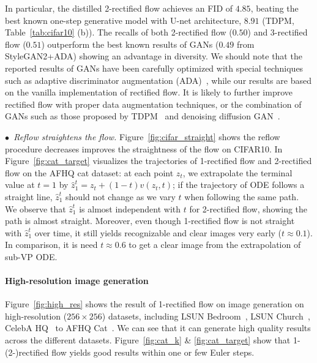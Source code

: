 In particular, 
the distilled 2-rectified flow achieves an FID of $4.85$, beating the best known one-step generative model with U-net architecture, $8.91$ (TDPM, Table~\ref{tab:cifar10} (b)).
The recalls of 
both 2-rectified flow ($0.50$) and 3-rectified flow ($0.51$) outperform the best known results of GANs ($0.49$ from StyleGAN2+ADA)
showing an advantage in diversity. 
We should note that the reported results of GANs have been carefully optimized 
with special techniques such as adaptive discriminator augmentation (ADA)~\citep{karras2020training}, while our results are
based on the vanilla implementation of rectified flow. 
It is likely to further improve rectified flow with proper data augmentation techniques, or the combination of GANs such as 
those proposed by TDPM~\citep{zheng2022truncated} and denoising diffusion GAN~\citep{xiao2021tackling}.







\emph{$\bullet$~Reflow straightens the flow.} 
Figure~\ref{fig:cifar_straight} shows the reflow procedure decreases improves the straightness of the flow on CIFAR10.  
In Figure~\ref{fig:cat_target} visualizes the trajectories of 1-rectified flow and 2-rectified flow on the AFHQ cat dataset: 
at each point $z_t$, we extrapolate the terminal value at $t=1$ by 
$\hat{z}_1^t = z_t + (1-t) v(z_t, t)$; 
if the trajectory of ODE follows a straight line, 
$\hat{z}_1^t$ should not change  as we vary $t$ when following the same path.  
We observe that $\hat{z}_1^t$ is almost independent with $t$ for 2-rectified flow, 
showing the path is almost straight.  
Moreover, even though 1-rectified flow is not straight with $\hat z_1^t$ over time, 
it still yields recognizable and clear images very early ($t\approx 0.1$). 
In comparison,  
it is need $t\approx 0.6$ to get a clear image
from the extrapolation of sub-VP ODE.  



\paragraph{High-resolution image generation}
Figure~\ref{fig:high_res} shows the result of 1-rectified flow on image generation  
on high-resolution ($256 \times 256$) datasets, including  
 LSUN Bedroom~\citep{yu2015lsun}, LSUN Church~\citep{yu2015lsun}, CelebA HQ~\citep{karras2018progressive} to AFHQ Cat~\citep{choi2020stargan}. We can see that it can generate high quality results across the different datasets.  
 Figure~\ref{fig:cat_k} \& \ref{fig:cat_target} show that 
1-(2-)rectified flow yields good results within one or few Euler steps.  

